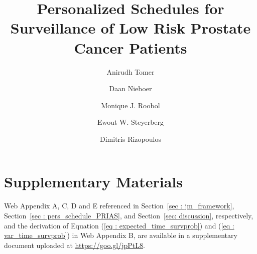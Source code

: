 \documentclass[a4paper]{article}
\begin{document}
\title{\textbf{Personalized Schedules for Surveillance of Low Risk Prostate Cancer Patients}}

\author[1,*]{Anirudh Tomer}
\author[2]{Daan Nieboer }
\author[3]{Monique J. Roobol }
\author[2,4]{Ewout W. Steyerberg }
\author[1]{Dimitris Rizopoulos}

\date{}

\maketitle











\section*{Supplementary Materials}

Web Appendix A, C, D and E referenced in Section~\ref{sec : jm_framework},  Section~\ref{sec : pers_schedule_PRIAS},  and  Section~\ref{sec: discussion}, respectively, and the derivation of Equation (\ref{eq : expected_time_survprob}) and (\ref{eq : var_time_survprob}) in Web Appendix B, are available in a supplementary document uploaded at \url{https://goo.gl/jpPtL8}.\vspace*{-8pt}

\textbf{}

\clearpage
\printbibliography

\appendix
\end{document}

